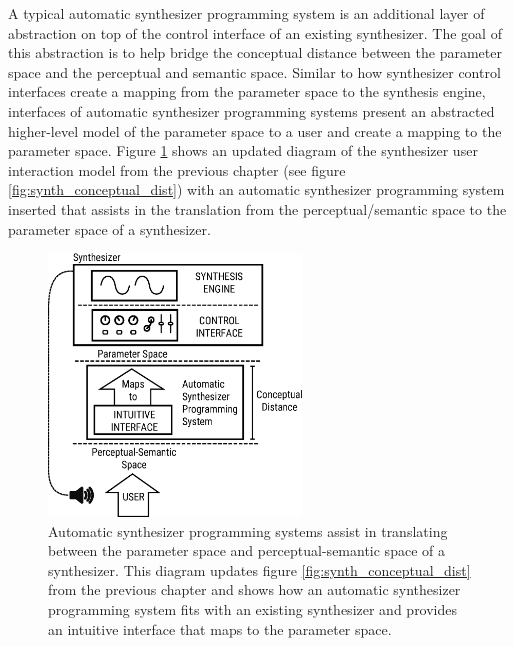 \label{sec:asp-approaches}
A typical automatic synthesizer programming system is an additional layer of abstraction on top of the control interface of an existing synthesizer. The goal of this abstraction is to help bridge the conceptual distance between the parameter space and the perceptual and semantic space. Similar to how synthesizer control interfaces create a mapping from the parameter space to the synthesis engine, interfaces of automatic synthesizer programming systems present an abstracted higher-level model of the parameter space to a user and create a mapping to the parameter space. Figure \ref{fig:asp_bridge_the_gap} shows an updated diagram of the synthesizer user interaction model from the previous chapter (see figure \ref{fig:synth_conceptual_dist}) with an automatic synthesizer programming system inserted that assists in the translation from the perceptual/semantic space to the parameter space of a synthesizer.


\begin{figure}
    \centering
    \includegraphics[width=0.6\textwidth]{figures/background/asp_bridging_the_gap.eps}
    \caption{Automatic synthesizer programming systems assist in translating between the parameter space and perceptual-semantic space of a synthesizer. This diagram updates figure \ref{fig:synth_conceptual_dist} from the previous chapter and shows how an automatic synthesizer programming system fits with an existing synthesizer and provides an intuitive interface that maps to the parameter space.}
    \label{fig:asp_bridge_the_gap}
\end{figure}

